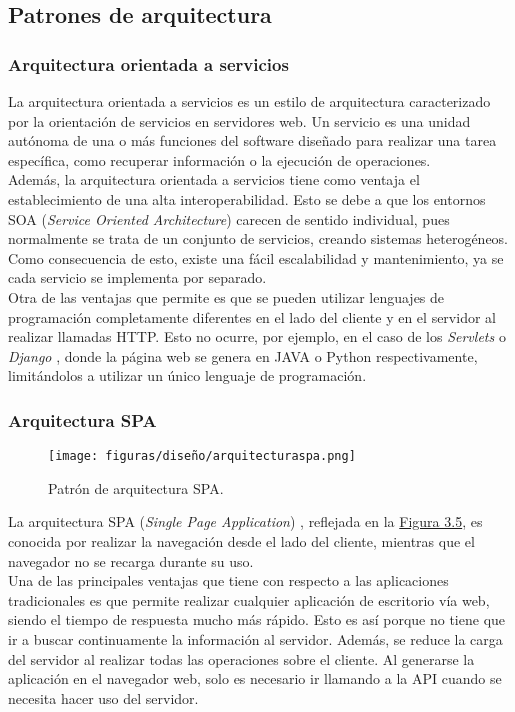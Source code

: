 \subsection{Patrones de arquitectura}

\subsubsection{Arquitectura orientada a servicios}

La arquitectura orientada a servicios \cite{soa} es un estilo de arquitectura caracterizado por la orientación de servicios en servidores web. Un servicio es una unidad autónoma de una o más funciones del software diseñado para realizar una tarea específica, como recuperar información o la ejecución de operaciones.
\\

Además, la arquitectura orientada a servicios tiene como ventaja el establecimiento de una alta interoperabilidad. Esto se debe a que los entornos SOA ({\it Service Oriented Architecture}) carecen de sentido individual, pues normalmente se trata de un conjunto de servicios, creando sistemas heterogéneos. Como consecuencia de esto, existe una fácil escalabilidad y mantenimiento, ya se cada servicio se implementa por separado.
\\

Otra de las ventajas que permite es que se pueden utilizar lenguajes de programación completamente diferentes en el lado del cliente y en el servidor al realizar llamadas HTTP. Esto no ocurre, por ejemplo, en el caso de los {\it Servlets} \cite{servlet} o {\it Django} \cite{django}, donde la página web se genera en JAVA o Python respectivamente, limitándolos a utilizar un único lenguaje de programación.

\subsubsection{Arquitectura SPA}

\begin{figure}[H]
\centerline{\texttt{[image: figuras/diseño/arquitecturaspa.png]}}
\caption{Patrón de arquitectura SPA.}
\label{enlaceSPA}
\end{figure}

La arquitectura SPA ({\it Single Page Application}) \cite{spa}, reflejada en la \hyperref[enlaceSPA]{Figura 3.5}, es conocida por realizar la navegación desde el lado del cliente, mientras que el navegador no se recarga durante su uso. 
\\

Una de las principales ventajas que tiene con respecto a las aplicaciones tradicionales es que permite realizar cualquier aplicación de escritorio vía web, siendo el tiempo de respuesta mucho más rápido. Esto es así porque no tiene que ir a buscar continuamente la información al servidor. Además, se reduce la carga del servidor al realizar todas las operaciones sobre el cliente. Al generarse la aplicación en el navegador web, solo es necesario ir llamando a la API cuando se necesita hacer uso del servidor.